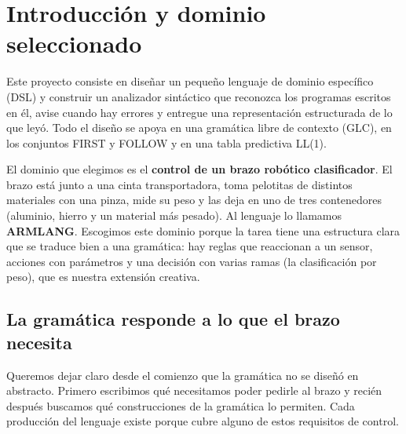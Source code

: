 \documentclass[10pt,a4paper]{article}
\begin{document}
\tableofcontents
\newpage

\section{Introducción y dominio seleccionado}
\label{sec:intro}

Este proyecto consiste en diseñar un pequeño lenguaje de dominio específico (DSL)
y construir un analizador sintáctico que reconozca los programas escritos en él,
avise cuando hay errores y entregue una representación estructurada de lo que
leyó. Todo el diseño se apoya en una gramática libre de contexto (GLC), en los
conjuntos FIRST y FOLLOW y en una tabla predictiva LL(1).

El dominio que elegimos es el \textbf{control de un brazo robótico clasificador}.
El brazo está junto a una cinta transportadora, toma pelotitas de distintos
materiales con una pinza, mide su peso y las deja en uno de tres contenedores
(aluminio, hierro y un material más pesado). Al lenguaje lo llamamos
\textbf{ARMLANG}. Escogimos este dominio porque la tarea tiene una estructura
clara que se traduce bien a una gramática: hay reglas que reaccionan a un sensor,
acciones con parámetros y una decisión con varias ramas (la clasificación por
peso), que es nuestra extensión creativa.

\subsection{La gramática responde a lo que el brazo necesita}

Queremos dejar claro desde el comienzo que la gramática no se diseñó en
abstracto. Primero escribimos qué necesitamos poder pedirle al brazo y recién
después buscamos qué construcciones de la gramática lo permiten. Cada producción
del lenguaje existe porque cubre alguno de estos requisitos de control.
\end{document}
